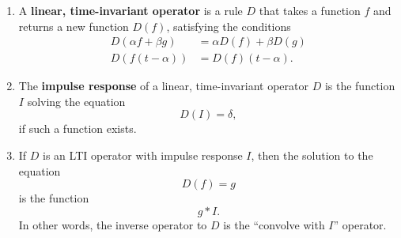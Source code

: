 \documentclass{article}
\begin{document}
\begin{enumerate}
	\item A \textbf{linear, time-invariant operator} is a rule $D$ that takes a function $f$ and returns a new function $D(f)$, satisfying the conditions
		\begin{align*}
			D(\alpha f+\beta g)&=\alpha D(f)+\beta D(g)\\
			D(f(t-\alpha))&=D(f)(t-\alpha).
		\end{align*}
	\item The \textbf{impulse response} of a linear, time-invariant operator $D$ is the function $I$ solving the equation
		\[D(I)=\delta,\]
		if such a function exists.
	\item If $D$ is an LTI operator with impulse response $I$, then the solution to the equation
		\[D(f)=g\]
		is the function
		\[g\ast I.\]
		In other words, the inverse operator to $D$ is the ``convolve with $I$'' operator.
\end{enumerate}
\end{document}

